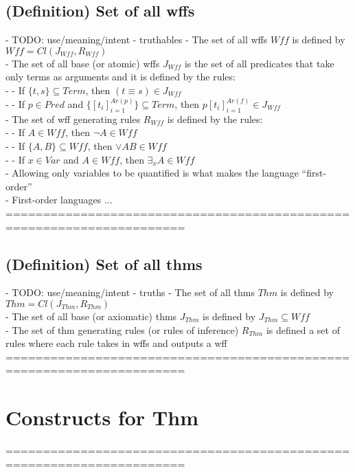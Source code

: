 \documentclass{article}
\begin{document}
\subsection{(Definition) Set of all wffs}
	- TODO: use/meaning/intent - truthables
	- The set of all wffs $Wff$ is defined by $Wff = Cl(J_{Wff}, R_{Wff})$ \\
	- The set of all base (or atomic) wffs $J_{Wff}$ is the set of all predicates that take only terms as arguments and it is defined by the rules: \\
		- - If $\{t, s\} \subseteq Term$, then $(t \equiv s) \in J_{Wff}$ \\
		- - If $p \in Pred$ and $\{[t_i]_{i=1}^{Ar(p)}\} \subseteq Term$, then $p [t_i]_{i=1}^{Ar(f)} \in J_{Wff}$ \\
	- The set of wff generating rules $R_{Wff}$ is defined by the rules: \\
		- - If $A \in Wff$, then $\lnot A \in Wff$ \\
		- - If $\{A, B\} \subseteq Wff$, then $\lor A B \in Wff$ \\
		- - If $x \in Var$ and $A \in Wff$, then $\exists_x A \in Wff$ \\
	- Allowing only variables to be quantified is what makes the language “first-order” \\
	- First-order languages ...
	======================================================================
\subsection{(Definition) Set of all thms}
	- TODO: use/meaning/intent - truths
	- The set of all thms $Thm$ is defined by $Thm = Cl(J_{Thm}, R_{Thm})$ \\
	- The set of all base (or axiomatic) thms $J_{Thm}$ is defined by $J_{Thm} \subseteq Wff$ \\
	- The set of thm generating rules (or rules of inference) $R_{Thm}$ is defined a set of rules where each rule takes in wffs and outputs a wff \\
	======================================================================

\section{Constructs for Thm}
	======================================================================
\end{document}
